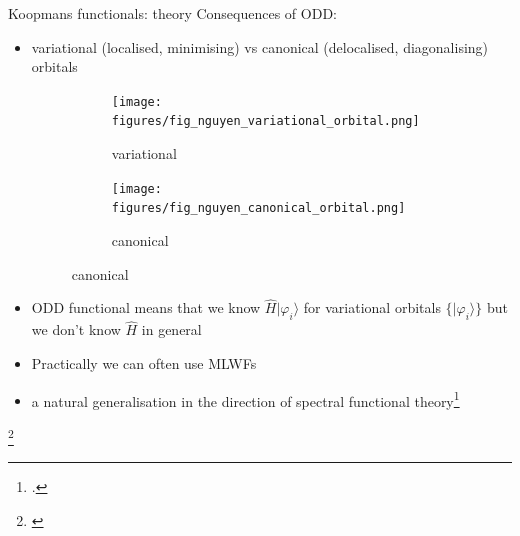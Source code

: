 \documentclass[xcolor=table,aspectratio=169]{beamer}
\newcommand\blfootcite[1]{%
  \begingroup
  \renewcommand\thefootnote{}\footnote{\hspace{-4ex}\cite{#1}}%
  \addtocounter{footnote}{-1}%
  \endgroup
}
\newcommand{\ket}[1]{|#1\rangle}
\numberwithin{equation}{section}
\begin{document}
\begin{frame}{Koopmans functionals: theory}
   Consequences of ODD:
   \begin{itemize}[<+->]
      \item variational (localised, minimising) vs canonical (delocalised, diagonalising) orbitals
            \begin{figure}[t]
               \centering
               \begin{subfigure}{0.3\textwidth}
                  \texttt{[image: figures/fig\_nguyen\_variational\_orbital.png]}
                  \caption{variational}
               \end{subfigure}
               \hspace{0.1\textwidth}
               \begin{subfigure}{0.3\textwidth}
                  \texttt{[image: figures/fig\_nguyen\_canonical\_orbital.png]}
                  \caption{canonical}
               \end{subfigure}
            \end{figure}
      \item ODD functional means that we know $\hat H \ket{\varphi_i}$ for variational orbitals $\{\ket{\varphi_i}\}$ but we don't know $\hat H$ in general
      \item Practically we can often use MLWFs
      \item a natural generalisation in the direction of spectral functional theory\footcite{Ferretti2014}
   \end{itemize}
   \blfootcite{Nguyen2018}

\end{frame}
\end{document}

